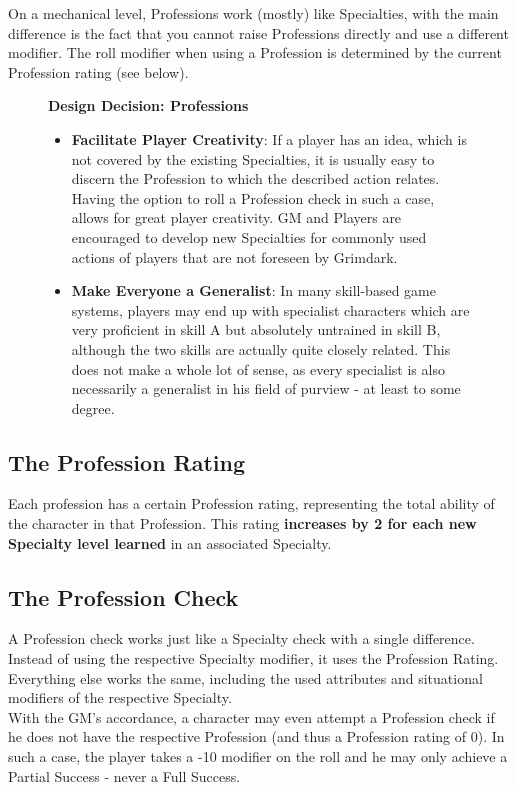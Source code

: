 	On a mechanical level, Professions work (mostly) like Specialties, with the main difference is the fact that you cannot raise Professions directly and use a different modifier.
	The roll modifier when using a Profession is determined by the current Profession rating (see below).

	\begin{figure}[hb]
		\begin{DndReadAloud}
		\textbf{Design Decision: Professions}
		\begin{itemize}
			\item \textbf{Facilitate Player Creativity}: If a player has an idea, which is not covered by the existing Specialties, it is usually easy to discern the Profession to which the described action relates. Having the option to roll a Profession check in such a case, allows for great player creativity. GM and Players are encouraged to develop new Specialties for commonly used actions of players that are not foreseen by Grimdark.
			\item \textbf{Make Everyone a Generalist}: In many skill-based game systems, players may end up with specialist characters which are very proficient in skill A but absolutely untrained in skill B, although the two skills are actually quite closely related. This does not make a whole lot of sense, as every specialist is also necessarily a generalist in his field of purview - at least to some degree.
			\end{itemize}
		\end{DndReadAloud}
	\end{figure}

\subsection{The Profession Rating}
	Each profession has a certain Profession rating, representing the total ability of the character in that Profession. 
	This rating \textbf{increases by 2 for each new Specialty level learned} in an associated Specialty.

\subsection{The Profession Check}
	A Profession check works just like a Specialty check with a single difference.
	Instead of using the respective Specialty modifier, it uses the Profession Rating.
	Everything else works the same, including the used attributes and situational modifiers of the respective Specialty.\\
	With the GM's accordance, a character may even attempt a Profession check if he does not have the respective Profession (and thus a Profession rating of 0).
	In such a case, the player takes a -10 modifier on the roll and he may only achieve a Partial Success - never a Full Success.

